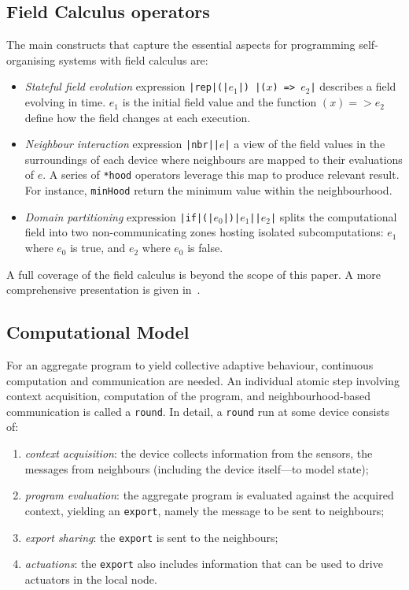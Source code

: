 \documentclass[conference]{IEEEtran}
\newcommand{\round}{\texttt{round}}
\newcommand{\export}{\texttt{export}}
\begin{document}
\subsection{Field Calculus operators}
The main constructs that capture the essential aspects for programming self-organising systems with field calculus are:
\begin{itemize}
  \item \textit{Stateful field evolution} expression \texttt{|{\color{teal}rep}|(|$e_1$|) {|($x$) => $e_2$|}} describes a field evolving in time. 
  $e_1$ is the initial field value and the function $(x) => e_2$ define how the field changes at each execution.
  \item \textit{Neighbour interaction} expression \texttt{|\color{teal}nbr|{|$e$|}} a view
  of the field values in the surroundings of each device where neighbours are
  mapped to their evaluations of $e$. A series of \texttt{*hood} operators leverage this map to produce relevant result. 
  For instance, \texttt{minHood} return the minimum value 
  within the neighbourhood.
  \item \textit{Domain partitioning} expression \texttt{|\color{teal}if|(|$e_0$|){|$e_1$|}{|$e_2$|}} splits the computational
  field into two non-communicating zones hosting isolated subcomputations:
  $e_1$ where $e_0$ is true, and $e_2$ where $e_0$ is false.
\end{itemize}
%
A full coverage of the field calculus is beyond the scope of this paper. A more comprehensive presentation is given in~\cite{DBLP:journals/jlap/ViroliBDACP19}.

\subsection{Computational Model}
%
For an aggregate program to yield collective adaptive behaviour, 
 continuous computation and communication are needed.
%
An individual atomic step 
 involving context acquisition,
 computation of the program,
 and neighbourhood-based communication 
 is called a \round{}.
%
In detail, a \round{} run at some device consists of:
\begin{enumerate}
  \item \emph{context acquisition}: the device collects information from the sensors, 
  the messages from neighbours
  (including the device itself---to model state);
  \item \emph{program evaluation}: the aggregate program is evaluated against the acquired context,
  yielding an \export{}, namely the message to be sent to neighbours;
  \item \emph{export sharing}: the \export{} is sent to the neighbours;
  \item \emph{actuations}: the \export{} also includes information that can be used to drive actuators in the local node.
\end{enumerate}
\end{document}
